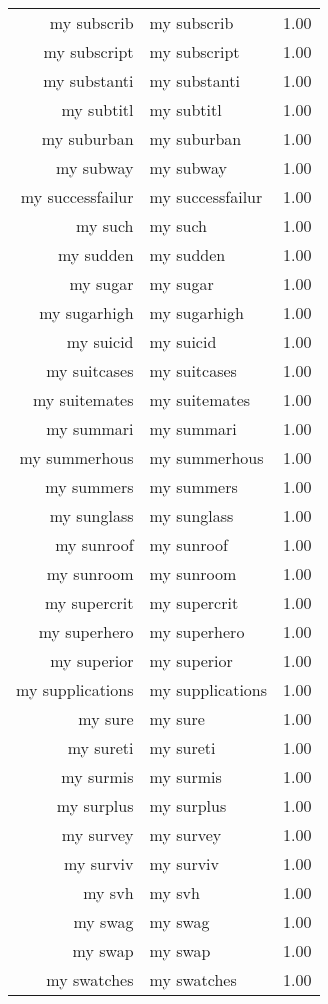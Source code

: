\begin{table}[ht]
\begin{tabular}{rlr}
  my subscrib & my subscrib & 1.00 \\ 
  my subscript & my subscript & 1.00 \\ 
  my substanti & my substanti & 1.00 \\ 
  my subtitl & my subtitl & 1.00 \\ 
  my suburban & my suburban & 1.00 \\ 
  my subway & my subway & 1.00 \\ 
  my successfailur & my successfailur & 1.00 \\ 
  my such & my such & 1.00 \\ 
  my sudden & my sudden & 1.00 \\ 
  my sugar & my sugar & 1.00 \\ 
  my sugarhigh & my sugarhigh & 1.00 \\ 
  my suicid & my suicid & 1.00 \\ 
  my suitcases & my suitcases & 1.00 \\ 
  my suitemates & my suitemates & 1.00 \\ 
  my summari & my summari & 1.00 \\ 
  my summerhous & my summerhous & 1.00 \\ 
  my summers & my summers & 1.00 \\ 
  my sunglass & my sunglass & 1.00 \\ 
  my sunroof & my sunroof & 1.00 \\ 
  my sunroom & my sunroom & 1.00 \\ 
  my supercrit & my supercrit & 1.00 \\ 
  my superhero & my superhero & 1.00 \\ 
  my superior & my superior & 1.00 \\ 
  my supplications & my supplications & 1.00 \\ 
  my sure & my sure & 1.00 \\ 
  my sureti & my sureti & 1.00 \\ 
  my surmis & my surmis & 1.00 \\ 
  my surplus & my surplus & 1.00 \\ 
  my survey & my survey & 1.00 \\ 
  my surviv & my surviv & 1.00 \\ 
  my svh & my svh & 1.00 \\ 
  my swag & my swag & 1.00 \\ 
  my swap & my swap & 1.00 \\ 
  my swatches & my swatches & 1.00 \\ 

\end{tabular}
\end{table}
